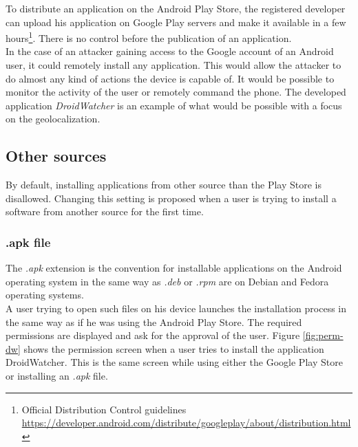 To distribute an application on the Android Play Store, the registered developer can upload his application on Google Play servers and make it available in a few hours\footnote{Official Distribution Control guidelines \url{https://developer.android.com/distribute/googleplay/about/distribution.html}}.
There is no control before the publication of an application.\\

In the case of an attacker gaining access to the Google account of an Android user, it could remotely install any application.
This would allow the attacker to do almost any kind of actions the device is capable of.
It would be possible to monitor the activity of the user or remotely command the phone.
The developed application \emph{DroidWatcher} is an example of what would be possible with a focus on the geolocalization.


\subsection{Other sources}
By default, installing applications from other source than the Play Store is disallowed.
Changing this setting is proposed when a user is trying to install a software from another source for the first time.

\subsubsection{.apk file}
The \emph{.apk} extension is the convention for installable applications on the Android operating system in the same way as \emph{.deb} or \emph{.rpm} are on Debian and Fedora operating systems.\\

A user trying to open such files on his device launches the installation process in the same way as if he was using the Android Play Store.
The required permissions are displayed and ask for the approval of the user.
Figure \ref{fig:perm-dw} shows the permission screen when a user tries to install the application DroidWatcher.
This is the same screen while using either the Google Play Store or installing an \emph{.apk} file.\\

